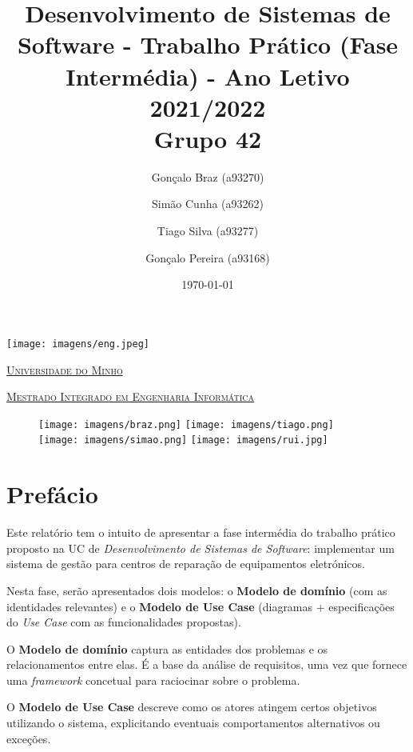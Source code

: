 \documentclass{article}
\title{Desenvolvimento de Sistemas de Software - Trabalho Prático (Fase Intermédia) - Ano Letivo 2021/2022\\
	\large Grupo 42}
\author{Gonçalo Braz (a93270)
	\and Simão Cunha (a93262)
	\and Tiago Silva (a93277)
	\and Gonçalo Pereira (a93168)}
\date{\today}
\begin{document}
	\begin{minipage}{0.9\linewidth}
        \centering
		\texttt{[image: imagens/eng.jpeg]}\par\vspace{1cm}
		\href{https://www.uminho.pt/PT}
		{\scshape\LARGE Universidade do Minho} \par
		\vspace{0.6cm}
		\href{https://miei.di.uminho.pt/}
		{\scshape\Large Mestrado Integrado em Engenharia Informática} \par
		\maketitle
		\begin{figure}[H]
		\centering
			\texttt{[image: imagens/braz.png]}
			\texttt{[image: imagens/tiago.png]}
			\texttt{[image: imagens/simao.png]}
			\texttt{[image: imagens/rui.jpg]}
		\end{figure}
	\end{minipage}
	
\pagebreak
\tableofcontents
\pagebreak
\maketitle

\section{Prefácio}

Este relatório tem o intuito de apresentar a fase intermédia do trabalho prático proposto na UC de \textit{Desenvolvimento de Sistemas de Software}: implementar um sistema de gestão para centros de reparação de equipamentos eletrónicos. \par

Nesta fase, serão apresentados dois modelos: o \textbf{Modelo de domínio} (com as identidades relevantes) e o \textbf{Modelo de Use Case} (diagramas + especificações do \textit{Use Case} com as funcionalidades propostas). \par

O \textbf{Modelo de domínio} captura as entidades dos problemas e os relacionamentos entre elas. É a base da análise de requisitos, uma vez que fornece uma \textit{framework} concetual para raciocinar sobre o problema.

O \textbf{Modelo de Use Case} descreve como os atores atingem certos objetivos utilizando o sistema, explicitando eventuais comportamentos alternativos ou exceções.
\end{document}
